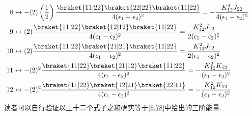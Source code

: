 \begin{align*}
8&\leftrightarrow -(2)\left( \frac{1}{2} \right) \frac{\braket{11|22}\braket{22|22}\braket{11|22}}{4(\epsilon_1 - \epsilon_2)^2}   = -\frac{K_{12}^2J_{22}}{4(\epsilon_1 - \epsilon_2)^2}\\
9&\leftrightarrow (2) \frac{\braket{11|22}\braket{12|12}\braket{11|22}}{4(\epsilon_1 - \epsilon_2)^2}   = \frac{K_{12}^2J_{12}}{2(\epsilon_1 - \epsilon_2)^2}\\
10&\leftrightarrow (2) \frac{\braket{11|22}\braket{21|21}\braket{11|22}}{4(\epsilon_1 - \epsilon_2)^2}   = \frac{K_{12}^2J_{12}}{2(\epsilon_1 - \epsilon_2)^2}\\
11&\leftrightarrow -(2)^2 \frac{\braket{11|22}\braket{21|12}\braket{11|22}}{4(\epsilon_1 - \epsilon_2)^2}   = -\frac{K_{12}^2K_{12}}{(\epsilon_1 - \epsilon_2)^2}\\
12&\leftrightarrow -(2)^2 \frac{\braket{11|22}\braket{12|21}\braket{22|11}}{4(\epsilon_1 - \epsilon_2)^2}   = -\frac{K_{12}^2K_{12}}{(\epsilon_1 - \epsilon_2)^2}
\end{align*}
读者可以自行验证以上十二个式子之和确实等于\autoref{6.78}中给出的三阶能量.

